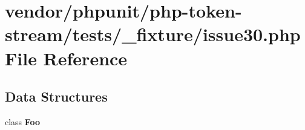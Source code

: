 \section{vendor/phpunit/php-\/token-\/stream/tests/\+\_\+fixture/issue30.php File Reference}
\label{issue30_8php}
\subsection*{Data Structures}
\begin{DoxyCompactItemize}
\item 
class {\bf Foo}
\end{DoxyCompactItemize}
